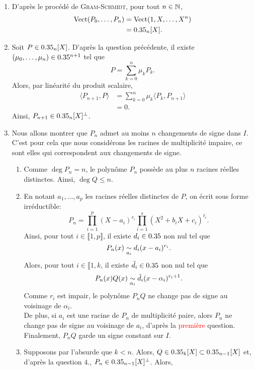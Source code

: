 \begin{solution}
\begin{enumerate}
        \item D'après le procédé de \textsc{Gram}-\textsc{Schmidt}, pour tout $n \in \mathbb{N}$,
        \begin{align*}
            \mathrm{Vect}(P_0, \dots, P_n) &= \mathrm{Vect}(1, X, \dots, X^n)\\
            &= 0.35_n[X].
        \end{align*}
        \item Soit $P \in 0.35_n[X]$. D'après la question précédente, il existe $(\mu_0, \dots, \mu_n) \in 0.35^{n+1}$ tel que
        $$P = \sum_{k=0}^n \mu_k P_k.$$
        Alors, par linéarité du produit scalaire,
        \begin{align*}
            \langle P_{n+1}, P \rangle &= \sum_{k=0}^n \mu_k \langle P_k, P_{n+1} \rangle \\
            &= 0.
        \end{align*}
        Ainsi, $P_{n+1} \in 0.35_n[X]^\perp$.
        \item Nous allons montrer que $P_n$ admet au moins $n$ changements de signe dans $I$. C'est pour cela que nous considérons les racines de multiplicité impaire, ce sont elles qui correspondent aux changements de signe. 
        \begin{enumerate}
            \item Comme $\deg P_n = n$, le polynôme $P_n$ possède au plus $n$ racines réelles distinctes. Ainsi, $\deg Q \leqslant n$.
            \item En notant $a_1, \dots, a_p$ les racines réelles distinctes de $P$, on écrit sous forme irréductible:
            $$P_n = \prod_{i=1}^p (X - a_i)^{r_i} \prod_{i=1}^s (X^2 + b_i X + c_i)^{\ell_i}.$$
            Ainsi, pour tout $i \in \llbracket 1,p \rrbracket$, il existe $d_i \in 0.35$ non nul tel que
            $$P_n(x) \isEquivTo{a_i} d_i (x - a_i)^{r_i}.$$
            Alors, pour tout $i \in \llbracket 1, k$, il existe $\tilde{d_i} \in 0.35$ non nul tel que
            $$P_n(x) Q(x) \isEquivTo{\alpha_i} \tilde{d_i} (x - \alpha_i)^{r_i+1}.$$
            Comme $r_i$ est impair, le polynôme $P_nQ$ ne change pas de signe au voisinage de $\alpha_i$. \\
            De plus, si $a_i$ est une racine de $P_n$ de multiplicité paire, alors $P_n$ ne change pas de signe au voisinage de $a_i$, d'après la \textcolor{red}{première} question. \\
            Finalement, $P_nQ$ garde un signe constant sur $I$.
            \item Supposons par l'absurde que $k < n$.  Alors, $Q \in 0.35_k[X] \subset 0.35_{n-1}[X]$ et, d'après la question $4.$, $P_n \in 0.35_{n-1}[X]^\perp$. Alors,

\end{enumerate}
\end{enumerate}
\end{solution}
